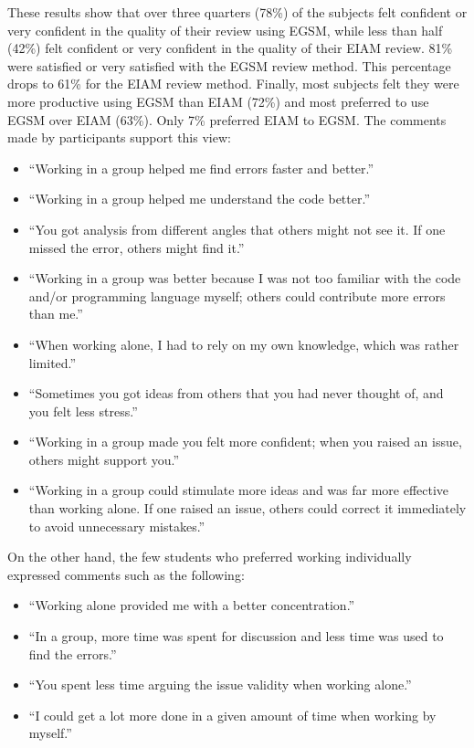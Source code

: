 These results show that over three quarters (78\%) of the subjects felt
confident or very confident in the quality of their review using EGSM,
while less than half (42\%) felt confident or very confident in the quality
of their EIAM review. 81\% were satisfied or very satisfied with the
EGSM
review method. This percentage drops to 61\% for the EIAM review method.
Finally, most subjects felt they were more productive using EGSM than EIAM
(72\%) and most preferred to use EGSM over EIAM (63\%). Only 7\% preferred
EIAM to EGSM.  The comments made by participants support this view:

\begin{itemize}
\item ``Working in a group helped me find errors faster and better.''
\item ``Working in a group helped me understand the code better.''
\item ``You got analysis from  different angles that
others might not see it. If one missed the error, others might find it.''
\item ``Working in a group was better because I was not too familiar with
the code and/or programming language myself; others could contribute
more errors than me.''
\item ``When working alone, I had to rely on my own knowledge, which was
rather limited.''
\item ``Sometimes you got ideas from others that you had never thought
of, and you felt less stress.''
\item ``Working in a group made you felt more confident; when you raised
an issue, others might support you.''
\item ``Working in a group could stimulate more ideas and was far more
effective than working alone. If one raised an issue, others could
correct it immediately to avoid unnecessary mistakes.''
\end{itemize}

On the other hand, the few students who preferred working individually
expressed comments such as the following:

\begin{itemize}
\item ``Working alone provided me with a better concentration.''
\item ``In a group, more time was spent for discussion and less time was
used to find the errors.''
\item ``You spent less time arguing the issue validity when working alone.''
\item ``I could get a lot more done in a given amount of time when working
by myself.''
\end{itemize}


